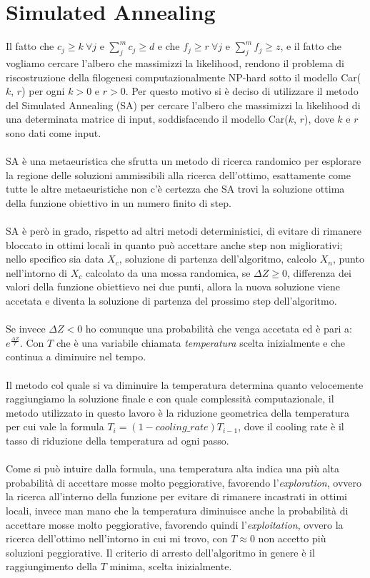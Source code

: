 \documentclass[12pt]{report}
\begin{document}
\section{Simulated Annealing}
  Il fatto che ${c}_{j}\geq k \ \forall j$ e $\sum_{j}^m {c}_{j} \geq d$ e che ${f}_{j}\geq r \ \forall j$ e $\sum_{j}^m {f}_{j} \geq z$, e il fatto che vogliamo cercare l'albero che massimizzi la likelihood, rendono il problema di riscostruzione della filogenesi computazionalmente NP-hard sotto il modello Car($k$, $r$) per ogni $k > 0$ e $r > 0$. Per questo motivo si è deciso di utilizzare il metodo del Simulated Annealing\cite{Kirkpatrick1983} (SA) per cercare l'albero che massimizzi la likelihood di una determinata matrice di input, soddisfacendo il modello Car($k$, $r$), dove $k$ e $r$ sono dati come input.\\\\
  SA è una metaeuristica che sfrutta un metodo di ricerca randomico per esplorare la regione delle soluzioni ammissibili alla ricerca dell'ottimo, esattamente come tutte le altre metaeuristiche non c'è certezza che SA trovi la soluzione ottima della funzione obiettivo in un numero finito di step.\\\\
  SA è però in grado, rispetto ad altri metodi deterministici, di evitare di rimanere bloccato in ottimi locali in quanto può accettare anche step non migliorativi; nello specifico sia data $X_{c}$, soluzione di partenza dell'algoritmo, calcolo $X_{n}$, punto nell'intorno di $X_{c}$ calcolato da una mossa randomica, se $\Delta Z\geq0$, differenza dei valori della funzione obiettievo nei due punti, allora la nuova soluzione viene accetata e diventa la soluzione di partenza del prossimo step dell'algoritmo.\\\\
  Se invece $\Delta Z < 0$ ho comunque una probabilità che venga accetata ed è pari a: $e^{\frac{\Delta Z}{T}}$.
  Con $T$ che è una variabile chiamata \emph{temperatura} scelta inizialmente e che continua a diminuire nel tempo.\\\\
  Il metodo col quale si va diminuire la temperatura determina quanto velocemente raggiungiamo la soluzione finale e con quale complessità computazionale, il metodo utilizzato in questo lavoro è la riduzione geometrica della temperatura per cui vale la formula $T_{i}=(1-cooling\_rate)T_{i-1}$, dove il cooling rate è il tasso di riduzione della temperatura ad ogni passo.\\\\
  Come si può intuire dalla formula, una temperatura alta indica una più alta probabilità di accettare mosse molto peggiorative, favorendo l'\emph{exploration}, ovvero la ricerca all'interno della funzione per evitare di rimanere incastrati in ottimi locali, invece man mano che la temperatura diminuisce anche la probabilità di accettare mosse molto peggiorative, favorendo quindi l'\emph{exploitation}, ovvero la ricerca dell'ottimo nell'intorno in cui mi trovo, con $T\approx 0$ non accetto più soluzioni peggiorative.
  Il criterio di arresto dell'algoritmo in genere è il raggiungimento della $T$ minima, scelta inizialmente.
\end{document}
